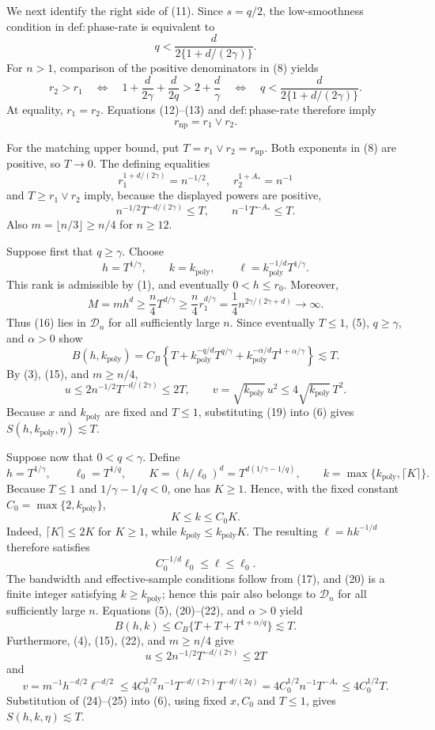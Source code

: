 We next identify the right side of (11).  Since \(s=q/2\), the low-smoothness condition in \(\mathrm{def{:}phase\text{-}rate}\) is equivalent to
\[
 q<\frac{d}{2\{1+d/(2\gamma)\}}.
 \tag{12}
\]
For \(n>1\), comparison of the positive denominators in (8) yields
\[
 r_2>r_1
 \quad\Longleftrightarrow\quad
 1+\frac d{2\gamma}+\frac d{2q}>2+\frac d\gamma
 \quad\Longleftrightarrow\quad
 q<\frac{d}{2\{1+d/(2\gamma)\}}.
 \tag{13}
\]
At equality, \(r_1=r_2\).  Equations (12)--(13) and \(\mathrm{def{:}phase\text{-}rate}\) therefore imply
\[
 r_{\mathrm{np}}=r_1\vee r_2.
 \tag{14}
\]

For the matching upper bound, put \(T=r_1\vee r_2=r_{\mathrm{np}}\).  Both exponents in (8) are positive, so \(T\to0\).  The defining equalities
\[
 r_1^{1+d/(2\gamma)}=n^{-1/2},
 \qquad
 r_2^{1+A_*}=n^{-1}
\]
and \(T\ge r_1\vee r_2\) imply, because the displayed powers are positive,
\[
 n^{-1/2}T^{-d/(2\gamma)}\le T,
 \qquad
 n^{-1}T^{-A_*}\le T.
 \tag{15}
\]
Also \(m=\lfloor n/3\rfloor\ge n/4\) for \(n\ge12\).

Suppose first that \(q\ge\gamma\).  Choose
\[
 h=T^{1/\gamma},\qquad k=k_{\mathrm{poly}},\qquad
 \ell=k_{\mathrm{poly}}^{-1/d}T^{1/\gamma}.
 \tag{16}
\]
This rank is admissible by (1), and eventually \(0<h\le r_0\).  Moreover,
\[
 M=m h^d
 \ge\frac n4 T^{d/\gamma}
 \ge\frac n4 r_1^{d/\gamma}
 =\frac14 n^{2\gamma/(2\gamma+d)}\longrightarrow\infty.
 \tag{17}
\]
Thus (16) lies in \(\mathcal D_n\) for all sufficiently large \(n\).  Since eventually \(T\le1\), (5), \(q\ge\gamma\), and \(\alpha>0\) show
\[
 B(h,k_{\mathrm{poly}})
 =C_B\left\{T+k_{\mathrm{poly}}^{-q/d}T^{q/\gamma}
 +k_{\mathrm{poly}}^{-\alpha/d}T^{1+\alpha/\gamma}\right\}
 \lesssim T.
 \tag{18}
\]
By (3), (15), and \(m\ge n/4\),
\[
 u\le2n^{-1/2}T^{-d/(2\gamma)}\le2T,
 \qquad
 v=\sqrt{k_{\mathrm{poly}}}\,u^2\le4\sqrt{k_{\mathrm{poly}}}\,T^2.
 \tag{19}
\]
Because \(x\) and \(k_{\mathrm{poly}}\) are fixed and \(T\le1\), substituting (19) into (6) gives \(S(h,k_{\mathrm{poly}},\eta)\lesssim T\).

Suppose now that \(0<q<\gamma\).  Define
\[
 h=T^{1/\gamma},\qquad \ell_0=T^{1/q},\qquad
 K=(h/\ell_0)^d=T^{d(1/\gamma-1/q)},
 \qquad
 k=\max\{k_{\mathrm{poly}},\lceil K\rceil\}.
 \tag{20}
\]
Because \(T\le1\) and \(1/\gamma-1/q<0\), one has \(K\ge1\).  Hence, with the fixed constant \(C_0=\max\{2,k_{\mathrm{poly}}\}\),
\[
 K\le k\le C_0K.
 \tag{21}
\]
Indeed, \(\lceil K\rceil\le2K\) for \(K\ge1\), while \(k_{\mathrm{poly}}\le k_{\mathrm{poly}}K\).  The resulting \(\ell=h k^{-1/d}\) therefore satisfies
\[
 C_0^{-1/d}\ell_0\le\ell\le\ell_0.
 \tag{22}
\]
The bandwidth and effective-sample conditions follow from (17), and (20) is a finite integer satisfying \(k\ge k_{\mathrm{poly}}\); hence this pair also belongs to \(\mathcal D_n\) for all sufficiently large \(n\).  Equations (5), (20)--(22), and \(\alpha>0\) yield
\[
 B(h,k)
 \le C_B\{T+T+T^{1+\alpha/q}\}
 \lesssim T.
 \tag{23}
\]
Furthermore, (4), (15), (22), and \(m\ge n/4\) give
\[
 u\le2n^{-1/2}T^{-d/(2\gamma)}\le2T
 \tag{24}
\]
and
\[
 v=m^{-1}h^{-d/2}\ell^{-d/2}
 \le4C_0^{1/2}n^{-1}T^{-d/(2\gamma)}T^{-d/(2q)}
 =4C_0^{1/2}n^{-1}T^{-A_*}\le4C_0^{1/2}T.
 \tag{25}
\]
Substitution of (24)--(25) into (6), using fixed \(x,C_0\) and \(T\le1\), gives \(S(h,k,\eta)\lesssim T\).

